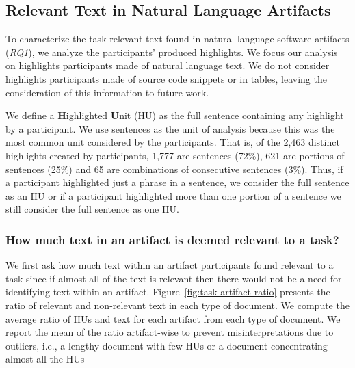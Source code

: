 \subsection{Relevant Text in Natural Language Artifacts}




To characterize the task-relevant text found in natural language 
software artifacts (\textit{RQ1}), 
we analyze the participants' produced highlights.
We focus
our analysis on highlights participants made of natural language
text. We do not
consider highlights participants made of source code snippets or in
tables, leaving the consideration of this information to future work.



We define a \textbf{H}ighlighted \textbf{U}nit (HU) as the full sentence containing any
highlight by a participant. 
We use sentences as the unit of analysis 
because this was the most common unit considered by the participants.
That is, of the 2,463
distinct highlights created by participants, 1,777 are sentences
(72\%), 621 are portions of sentences (25\%) and 65 are combinations
of consecutive sentences (3\%). 
Thus, if a participant highlighted just a
phrase in a sentence, we consider the full sentence as an HU or if a
participant highlighted more than one portion of a sentence we still
consider the full sentence as one HU. 


\subsubsection{How much text in an artifact is deemed relevant to a task?}
\label{cp3:ratio}




We first ask how much text within an artifact participants found relevant to a task
since if almost all of the text  is relevant then there would not be a need for
identifying text within an artifact.
Figure~\ref{fig:task-artifact-ratio} presents the ratio of relevant and non-relevant text in each type of document.
We compute the average ratio of HUs and text for each  artifact from each type of document.
We report the mean of the ratio artifact-wise to prevent misinterpretations due to outliers,
i.e., a lengthy document with few HUs or a document concentrating almost all the HUs






